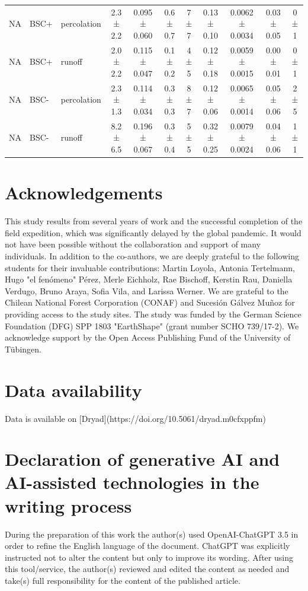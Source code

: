 \begin{table}
{\begin{tabular}{lllcccccccc}
NA  & BSC+ & percolation & 2.3 ± 2.2  & 0.095 ± 0.060 & 0.6 ± 0.7   & 7 ± 7     & 0.13 ± 0.10  & 0.0062 ± 0.0034 & 0.03 ± 0.05 & 0 ± 1   \\
NA  & BSC+ & runoff      & 2.0 ± 2.2  & 0.115 ± 0.047 & 0.1 ± 0.2   & 4 ± 5     & 0.12 ± 0.18  & 0.0059 ± 0.0015 & 0.00 ± 0.01 & 0 ± 1   \\
NA  & BSC- & percolation & 2.3 ± 1.3  & 0.114 ± 0.034 & 0.3 ± 0.3   & 8 ± 7     & 0.12 ± 0.06  & 0.0065 ± 0.0014 & 0.05 ± 0.06 & 2 ± 5   \\
NA  & BSC- & runoff      & 8.2 ± 6.5  & 0.196 ± 0.067 & 0.3 ± 0.4   & 5 ± 5     & 0.32 ± 0.25  & 0.0079 ± 0.0024 & 0.04 ± 0.06 & 1 ± 1   \\
\hline
\end{tabular}
} %
\end{table}

\FloatBarrier

\section*{Acknowledgements}

This study results from several years of work and the successful completion of the field expedition, which was significantly delayed by the global pandemic. It would not have been possible without the collaboration and support of many individuals. In addition to the co-authors, we are deeply grateful to the following students for their invaluable contributions: Martin Loyola, Antonia Tertelmann, Hugo "el fenómeno" Pérez, Merle Eichholz, Rae Bischoff, Kerstin Rau, Daniella Verdugo, Bruno Araya, Sofia Vila, and Larissa Werner. We are grateful to the Chilean National Forest Corporation (CONAF) and Sucesión Gálvez Muñoz for providing access to the study sites. The study was funded by the German Science Foundation (DFG) SPP 1803 "EarthShape" (grant number SCHO 739/17-2). We acknowledge support by the Open Access Publishing Fund of the University of Tübingen.

\section*{Data availability}

Data is available on [Dryad](https://doi.org/10.5061/dryad.m0cfxppfm)

\section*{Declaration of generative AI and AI-assisted technologies in the writing process}

During the preparation of this work the author(s) used OpenAI-ChatGPT 3.5 in order to refine the English language of the document. ChatGPT was explicitly instructed not to alter the content but only to improve its wording. After using this tool/service, the author(s) reviewed and edited the content as needed and take(s) full responsibility for the content of the published article.
